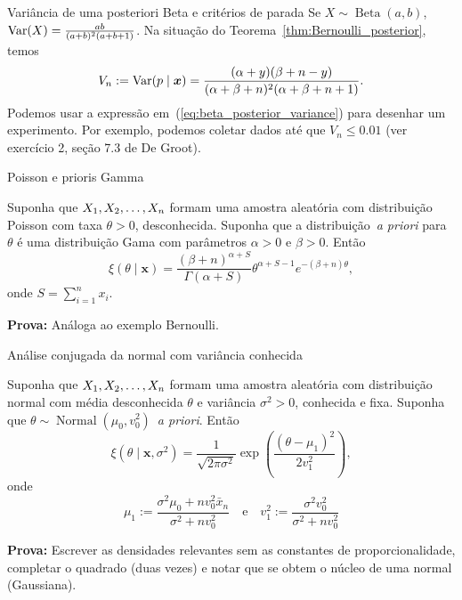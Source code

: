 \begin{frame}{Variância de uma posteriori Beta e critérios de parada}
 Se $X \sim \operatorname{Beta}(a, b)$, $\operatorname{Var}(X) = \frac{ab}{(a+b)^2(a + b+ 1)}$.
 Na situação do Teorema~\ref{thm:Bernoulli_posterior}, temos
 \begin{equation}
  \label{eq:beta_posterior_variance}
 V_n := \operatorname{Var}(p \mid \boldsymbol{x}) = \frac{(\alpha + y)(\beta + n - y)}{(\alpha + \beta + n)^2(\alpha + \beta + n + 1)}.  
 \end{equation}
 Podemos usar a expressão em~(\ref{eq:beta_posterior_variance}) para desenhar um experimento.
 Por exemplo, podemos coletar dados até que $V_n \leq 0.01$ (ver exercício 2, seção 7.3 de De Groot). 
\end{frame}

\begin{frame}{Poisson e prioris Gamma}
 \begin{theo}
  Suponha que $X_1, X_2, \ldots, X_n$ formam uma amostra aleatória com distribuição Poisson com taxa $\theta > 0$, desconhecida.
  Suponha que a distribuição~\textit{a priori} para $\theta$ é uma distribuição Gama com parâmetros $\alpha >0$ e $\beta > 0$.
  Então
  \begin{equation}
   \xi(\theta \mid \boldsymbol{x}) = \frac{ (\beta + n)^{\alpha + S} }{\Gamma(\alpha + S)} \theta^{\alpha+S-1} e^{-(\beta+n)\theta},
  \end{equation}
  onde $S = \sum_{i=1}^n x_i$.
 \end{theo}
\textbf{Prova:} Análoga ao exemplo Bernoulli.
\end{frame}

\begin{frame}{Análise conjugada da normal com variância conhecida}
 \begin{theo}
  Suponha que $X_1, X_2, \ldots, X_n$ formam uma amostra aleatória com distribuição normal com média desconhecida $\theta$ e variância $\sigma^2 >0$, conhecida e fixa.
  Suponha que $\theta \sim \operatorname{Normal}(\mu_0, v_0^2)$~\textit{a priori}.
  Então
  \begin{equation}
   \xi(\theta \mid \boldsymbol{x}, \sigma^2) =  \frac{1}{\sqrt{2\pi\sigma^2}} \exp\left( \frac{(\theta-\mu_1)^2}{2v_1^2} \right),
  \end{equation}
onde
\begin{equation}
\mu_1 := \frac{\sigma^2 \mu_0 + nv_0^2\bar{x}_n}{\sigma^2 + nv_0^2} \quad\text{e}\quad v_1^2 := \frac{\sigma^2v_0^2}{\sigma^2 + nv_0^2}
\end{equation}
\end{theo}
\textbf{Prova:} Escrever as densidades relevantes sem as constantes de proporcionalidade, completar o quadrado (duas vezes) e notar que se obtem o núcleo de uma normal (Gaussiana).
\end{frame}

